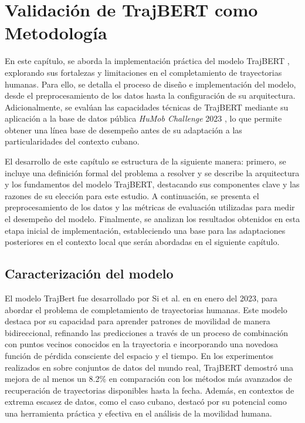\chapter{Validación de TrajBERT como Metodología}\label{chapter:proposal}

En este capítulo, se aborda la implementación práctica del modelo TrajBERT \cite{si2023trajbert}, explorando sus fortalezas y limitaciones en el completamiento de trayectorias humanas. Para ello, se detalla el proceso de diseño e implementación del modelo, desde el preprocesamiento de los datos hasta la configuración de su arquitectura. Adicionalmente, se evalúan las capacidades técnicas de TrajBERT mediante su aplicación a la base de datos pública \textit{HuMob Challenge} 2023 \cite{humob2023}, lo que permite obtener una línea base de desempeño antes de su adaptación a las particularidades del contexto cubano.

El desarrollo de este capítulo se estructura de la siguiente manera: primero, se incluye una definición formal del problema a resolver y se describe la arquitectura y los fundamentos del modelo TrajBERT, destacando sus componentes clave y las razones de su elección para este estudio. A continuación, se presenta el preprocesamiento de los datos y las métricas de evaluación utilizadas para medir el desempeño del modelo. Finalmente, se analizan los resultados obtenidos en esta etapa inicial de implementación, estableciendo una base para las adaptaciones posteriores en el contexto local que serán abordadas en el siguiente capítulo.

\section{Caracterización del modelo}

El modelo TrajBert fue desarrollado por Si et al. en \cite{si2023trajbert} en enero del 2023, para abordar el problema de completamiento de trayectorias humanas. Este modelo destaca por su capacidad para aprender patrones de movilidad de manera bidireccional, refinando las predicciones a través de un proceso de combinación con puntos vecinos conocidos en la trayectoria e incorporando una novedosa función de pérdida consciente del espacio y el tiempo. En los experimentos realizados en \cite{si2023trajbert} sobre conjuntos de datos del mundo real, TrajBERT demostró una mejora de al menos un 8.2\% en comparación con los métodos más avanzados de recuperación de trayectorias disponibles hasta la fecha. Además, en contextos de extrema escasez de datos, como el caso cubano, destacó por su potencial como una herramienta práctica y efectiva en el análisis de la movilidad humana.

